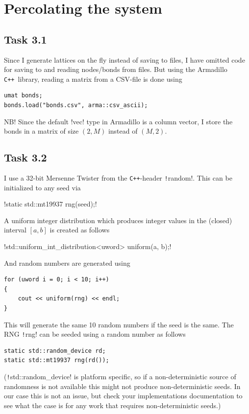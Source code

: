 \documentclass[a4paper]{article}
\newcommand{\cpp}{\texttt{C++}}
\begin{document}
\section{Percolating the system}
\subsection*{Task 3.1}
Since I generate lattices on the fly instead of saving to files, I have omitted code for saving to and reading nodes/bonds from files. But using the Armadillo \cpp\ library, reading a matrix from a CSV-file is done using
\begin{verbatim}
umat bonds;
bonds.load("bonds.csv", arma::csv_ascii);
\end{verbatim}

NB! Since the default \cppinline!vec! type in Armadillo is a column vector, I store the bonds in a matrix of size $(2, M)$ instead of $(M, 2)$.

\subsection*{Task 3.2}
I use a 32-bit Mersenne Twister from the \cpp-header \texttt!random!. This can be initialized to any seed via

!static std::mt19937 rng(seed);!

A uniform integer distribution which produces integer values in the (closed) interval $\left[a, b\right]$ is created as follows

!std::uniform_int_distribution<uword> uniform(a, b);!

And random numbers are generated using

\begin{verbatim}
for (uword i = 0; i < 10; i++)
{
    cout << uniform(rng) << endl;
}
\end{verbatim}

This will generate the same 10 random numbers if the seed is the same. The RNG \texttt!rng! can be seeded using a random number as follows
\begin{verbatim}
static std::random_device rd;
static std::mt19937 rng(rd());
\end{verbatim}
(\texttt!std::random_device! is platform specific, so if a non-deterministic source of randomness is not available this might not produce non-deterministic seeds. In our case this is not an issue, but check your implementations documentation to see what the case is for any work that requires non-deterministic seeds.)
\end{document}
